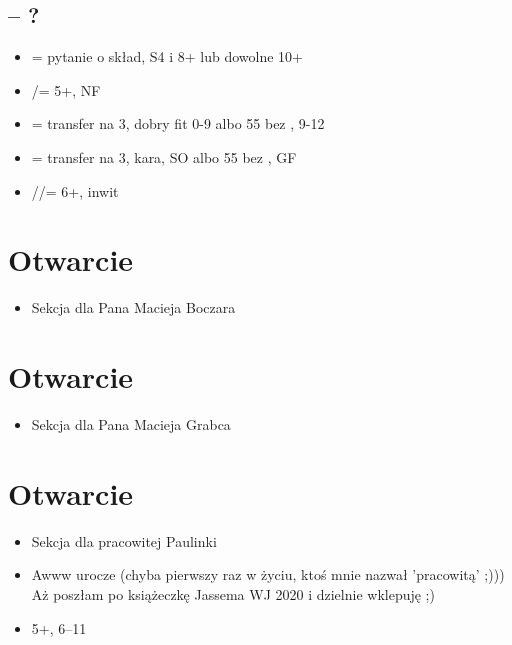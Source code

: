 \documentclass[12pt]{article}
\begin{document}
\subsection{\texorpdfstring{\Cs[2] – ?}{1C – ?}}
\begin{itemize}
    \item \Ds[2] = pytanie o skład, S4 i 8+ lub dowolne 10+
    \item \Hs[2]/\Ss[] = 5+, NF
    \item \NT[2] = transfer na 3\Cs, dobry fit 0-9 albo 55 bez \Cs, 9-12
    \item \Cs[3] = transfer na 3\Ds, kara, SO albo 55 bez \Cs, GF
    \item \Ds[3]/\Hs/\Ss[] = 6+, inwit
\end{itemize}

\newpage
\section{Otwarcie \texorpdfstring{\Ds[2]}{2D}}
\begin{itemize}
    \item Sekcja dla Pana Macieja Boczara
\end{itemize}

\newpage
\section{Otwarcie \texorpdfstring{\Hs[2]}{2H}}
\begin{itemize}
    \item Sekcja dla Pana Macieja Grabca
\end{itemize}

\newpage
\section{Otwarcie \texorpdfstring{\NT[2]}{2NT}}
\begin{itemize}
    \item Sekcja dla pracowitej Paulinki
    \item Awww urocze \Hs \Hs \Hs  (chyba pierwszy raz w życiu, ktoś mnie nazwał 'pracowitą' ;))) Aż poszłam po książeczkę Jassema WJ 2020 i dzielnie wklepuję ;)
    \item 5+\Cs\Ds, 6–11 
\end{itemize}
\end{document}
